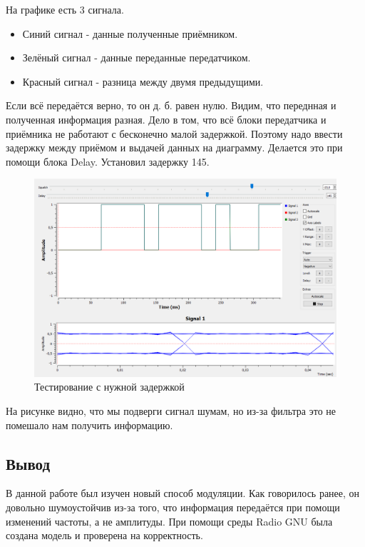 На графике есть 3 сигнала.
\begin{itemize}
    \item Синий сигнал - данные полученные приёмником. 
    \item Зелёный сигнал - данные переданные передатчиком.
    \item Красный сигнал - разница между двумя предыдущими. 
\end{itemize}

Если всё передаётся верно, то он д. б. равен нулю. Видим, что переднная и полученная информация разная. Дело в том, что всё блоки передатчика и приёмника не работают с бесконечно малой задержкой. Поэтому надо ввести задержку между приёмом и выдачей данных на диаграмму. Делается это при помощи блока Delay. Установил задержку 145.

    \begin{figure}[H]
	\begin{center}
		\includegraphics[scale=0.4]{fig/lab12/e2.png}
		\caption{Тестирование с нужной задержкой}
		\label{pic:e2} %
	\end{center}
\end{figure}

На рисунке видно, что мы подверги сигнал шумам, но из-за фильтра это не помешало нам получить информацию.

\subsection{Вывод}
В данной работе был изучен новый способ модуляции. Как говорилось ранее, он довольно шумоустойчив из-за того, что информация передаётся при помощи изменений частоты, а не амплитуды. При помощи среды Radio GNU была создана модель и проверена на корректность.